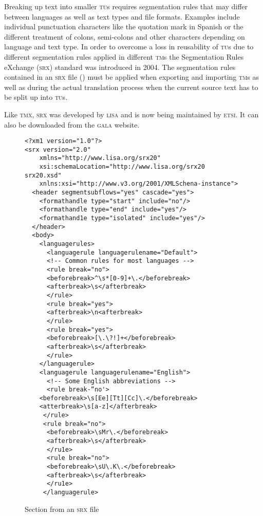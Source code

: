 \documentclass[output=paper]{LSP/langsci}
\begin{document}
Breaking up text into smaller \textsc{tu}s requires segmentation rules that may differ between languages as well as text types and file formats. Examples include individual punctuation characters like the quotation mark in Spanish or the different treatment of colons, semi-colons and other characters depending on language and text type. In order to overcome a loss in reusability of \textsc{tu}s due to different segmentation rules applied in different \textsc{tm}s the Segmentation Rules eXchange (\textsc{srx}) standard was introduced in 2004. The segmentation rules contained in an \textsc{srx} file () must be applied when exporting and importing \textsc{tm}s as well as during the actual translation process when the current source text has to be split up into \textsc{tu}s.

Like \textsc{tmx}, \textsc{srx} was developed by \textsc{lisa} and is now being maintained by \textsc{etsi}. It can also be downloaded from the \textsc{gala} website.

\begin{figure}
\begin{lstlisting}
<?xm1 version="1.0"?>
<srx version="2.0"
    xmlns="http://www.lisa.org/srx20"
    xsi:schemaLocation="http://www.lisa.org/srx20 srx20.xsd"
    xnlns:xsi="http://www.v3.org/2001/XMLSchena-instance">
  <header segmentsubflows="yes" cascade="yes">
    <formathandle type="start" include="no"/>
    <formathandle type="end" include="yes"/>
    <formathand1e type="isolated" include="yes"/>
  </header>
  <body>
    <languagerules>
      <languagerule languagerulename="Default">
      <!-- Common rules for most languages -->
      <rule break="no">
	  <beforebreak>^\s*[0-9]+\.</beforebreak>
	  <afterbreak>\s</afterbreak>
      </rule>
      <rule break="yes">
	  <afterbreak>\n<afterbreak>
      </rule>
      <rule break="yes">
	  <beforebreak>[\.\?!]+</beforebreak>
	  <afterbreak>\s</afterbreak>
      </rule>
    </languagerule>
    <languagerule languagerulename="English">
      <!-- Some English abbreviations -->
      <rule break-“no'>
	<beforebreak>\s[Ee][Tt][Cc]\.</beforebreak>
	<atterbreak>\s[a-z]</afterbreak>
     </rule>
     <rule break="no">
	  <beforebreak>\sMr\.</beforebreak>
	  <afterbreak>\s</afterbreak>
      </ru1e>
      <rule break="no">
	  <beforebreak>\sU\.K\.</beforebreak>
	  <afterbreak>\s</afterbreak>
      </ru1e>
     </languagerule>
\end{lstlisting}

\caption{Section from an \textsc{srx} file}
\label{fig:reinke:9}
\end{figure}
\end{document}
